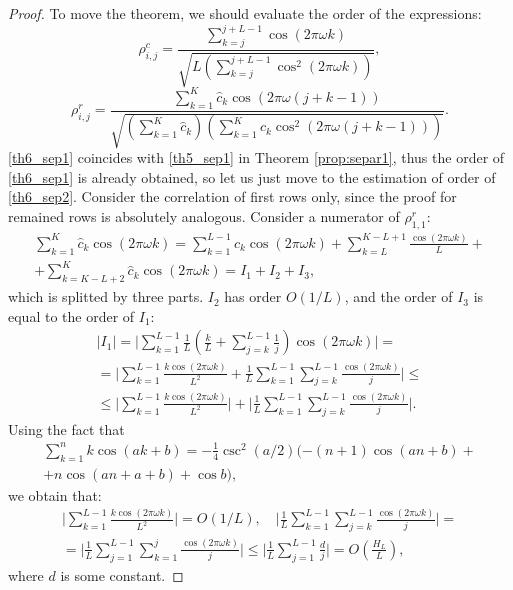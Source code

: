 \documentclass[sii]{ipart}
\begin{document}
\begin{proof}
	To move the theorem, we should evaluate the order of the expressions:
	\begin{equation}\label{th6_sep1}
	\rho^c_{i,j} = \frac{\sum_{k=j}^{j + L - 1} \cos(2 \pi \omega k)}{\sqrt{L (\sum_{k=j}^{j + L - 1} \cos^2(2 \pi \omega k))}},
	\end{equation}
	\begin{equation}\label{th6_sep2}
	\rho^r_{i,j} = \frac{\sum_{k=1}^K \hat c_k\cos(2 \pi \omega (j + k - 1))}{\sqrt{(\sum_{k=1}^K \hat c_k) (\sum_{k=1}^K \hat c_k\cos^2(2 \pi \omega (j + k - 1)))}}.
	\end{equation}
	\eqref{th6_sep1} coincides with \eqref{th5_sep1} in Theorem \ref{prop:separ1}, thus
	the order of \eqref{th6_sep1} is already obtained, so let us just move to the estimation of order of \eqref{th6_sep2}. Consider the correlation of first rows only, since the proof for remained rows is absolutely analogous. Consider a numerator of $\rho^r_{1,1}$:
	\begin{gather*}
	\sum_{k=1}^K \hat c_k\cos(2 \pi \omega k) = \sum_{k=1}^{L-1} \hat c_k\cos(2 \pi \omega k) + \sum_{k=L}^{K - L + 1} \frac{\cos(2 \pi \omega k)}{L} +\\+ \sum_{k=K - L + 2}^{K} \hat c_k\cos(2 \pi \omega k) = I_1 + I_2 + I_3,
	\end{gather*}
	which is splitted by three parts. $I_2$ has order $O(1/L)$, and the order of $I_3$ is equal to the order of $I_1$:
	\begin{multline*}
	|I_1|=\bigg|\sum_{k=1}^{L-1}\frac{1}{L}\left(\frac{k}{L} + \sum_{j=k}^{L-1} \frac{1}{j} \right) \cos(2 \pi \omega k)\bigg| =\\= \bigg|\sum_{k=1}^{L-1} \frac{k \cos(2 \pi \omega k)}{L^2} +  \frac{1}{L}\sum_{k = 1}^{L-1}\sum_{j = k}^{L-1}\frac{\cos(2 \pi \omega k)}{j}\bigg| \le \\ \le
	\bigg|\sum_{k=1}^{L-1} \frac{k \cos(2 \pi \omega k)}{L^2}\bigg| + \bigg|\frac{1}{L}\sum_{k = 1}^{L-1}\sum_{j = k}^{L-1}\frac{\cos(2 \pi \omega k)}{j}\bigg|.
	\end{multline*}
	Using the fact that
	\begin{multline*}
	\sum_{k=1}^n k \cos(ak + b) = -\frac{1}{4}\csc^2(a/2)(-(n+1)\cos(an+b) + \\ + n\cos(an + a + b) + \cos b),
	\end{multline*}
	we obtain that:
	\begin{multline*}
	\bigg|\sum_{k=1}^{L-1} \frac{k \cos(2 \pi \omega k)}{L^2}\bigg| = O(1/L), \quad
	\bigg|\frac{1}{L}\sum_{k = 1}^{L-1}\sum_{j = k}^{L-1}\frac{\cos(2 \pi \omega k)}{j}\bigg| = \\ =\bigg|\frac{1}{L}\sum_{j = 1}^{L-1}\sum_{k = 1}^{j}\frac{\cos(2 \pi \omega k)}{j}\bigg| \le \bigg|\frac{1}{L}\sum_{j = 1}^{L-1}\frac{d}{j}\bigg| = O \left(\frac{H_L}{L} \right),
	\end{multline*}
	where $d$ is some constant.
	

\end{proof}
\end{document}
